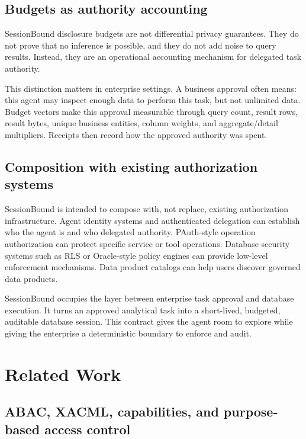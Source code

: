 \documentclass[journal]{IEEEtran}
\begin{document}
\hypertarget{budgets-as-authority-accounting}{%
\subsection{Budgets as authority
accounting}\label{budgets-as-authority-accounting}}

SessionBound disclosure budgets are not differential privacy guarantees.
They do not prove that no inference is possible, and they do not add
noise to query results. Instead, they are an operational accounting
mechanism for delegated task authority.

This distinction matters in enterprise settings. A business approval
often means: this agent may inspect enough data to perform this task,
but not unlimited data. Budget vectors make this approval measurable
through query count, result rows, result bytes, unique business
entities, column weights, and aggregate/detail multipliers. Receipts then
record how the approved authority was spent.

\hypertarget{composition-with-existing-authorization-systems}{%
\subsection{Composition with existing authorization
systems}\label{composition-with-existing-authorization-systems}}

SessionBound is intended to compose with, not replace, existing
authorization infrastructure. Agent identity systems and authenticated
delegation can establish who the agent is and who delegated authority.
PAuth-style operation authorization can protect specific service or tool
operations. Database security systems such as RLS or Oracle-style policy
engines can provide low-level enforcement mechanisms. Data product
catalogs can help users discover governed data products.

SessionBound occupies the layer between enterprise task approval and
database execution. It turns an approved analytical task into a
short-lived, budgeted, auditable database session. This contract gives
the agent room to explore while giving the enterprise a deterministic
boundary to enforce and audit.


\hypertarget{related-work}{%
\section{Related Work}\label{related-work}}

\hypertarget{abac-xacml-capabilities-and-purpose-based-access-control}{%
\subsection{ABAC, XACML, capabilities, and purpose-based access
control}\label{abac-xacml-capabilities-and-purpose-based-access-control}}
\end{document}
